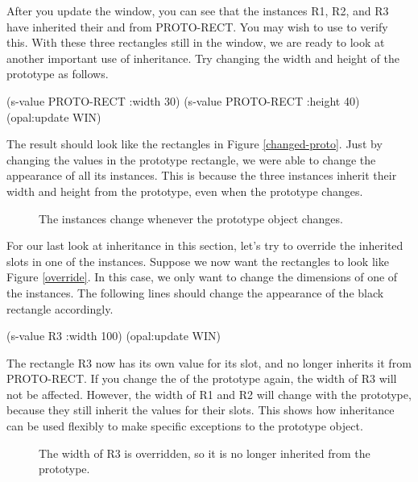 After you update the window, you can see that the instances R1, R2,
and R3 have inherited their  and  from
PROTO-RECT.  You may wish to use  to verify this.  With
these three rectangles still in the window, we are ready to look at
another important use of inheritance.  Try changing the width and
height of the prototype as follows.

\begin{programexample}
(s-value PROTO-RECT :width 30)
(s-value PROTO-RECT :height 40)
(opal:update WIN)
\end{programexample}

The result should look like the rectangles in Figure \ref{changed-proto}.
Just by changing the values in the prototype rectangle, we were able
to change the appearance of all its instances.  This is because the
three instances inherit their width and height from the prototype,
even when the prototype changes.

\begin{figure}
\begin{center}
  \end{center}
\caption{The instances change whenever the prototype object changes.}
\end{figure}

For our last look at inheritance in this section, let's try to
override the inherited slots in one of the instances.  Suppose we now
want the rectangles to look like Figure \ref{override}.  In this case,
we only want to change the dimensions of one of the instances.  The
following lines should change the appearance of the black rectangle
accordingly.

\begin{programexample}
(s-value R3 :width 100)
(opal:update WIN)
\end{programexample}

The rectangle R3 now has its own value for its  slot, and
no longer inherits it from PROTO-RECT.  If you change the 
of the prototype again, the width of R3 will not be affected.
However, the width of R1 and R2 will change with the prototype,
because they still inherit the values for their  slots.
This shows how inheritance can be used flexibly to make specific
exceptions to the prototype object.

\begin{figure}
\begin{center}
\end{center}
\caption{The width of R3 is overridden, so it is no longer inherited
from the prototype.}
\end{figure}


